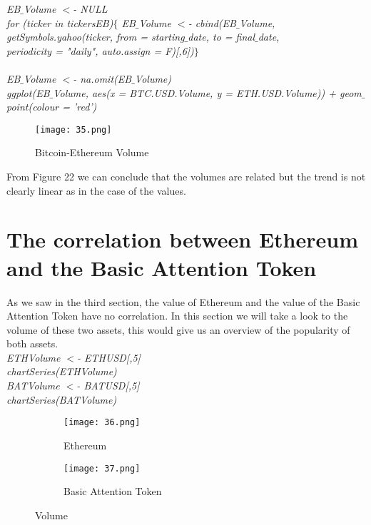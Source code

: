 \documentclass[14pt]{amsart}
\begin{document}
\noindent \textit{EB$\_$Volume $<$- NULL}\\
\noindent \textit{for (ticker in tickersEB)$\{$  EB$\_$Volume $<$- cbind(EB$\_$Volume, }\\
\indent\textit{getSymbols.yahoo(ticker, from = starting$\_$date, to = final$\_$date, }\\
\indent\textit{periodicity = "daily", auto.assign = F)[,6])$\}$}\\ \\

\noindent \textit{EB$\_$Volume $<$- na.omit(EB$\_$Volume)}\\
\noindent \textit{ggplot(EB$\_$Volume, aes(x = BTC.USD.Volume, y = ETH.USD.Volume)) + geom$\_$point(colour = 'red')}\\

\begin{figure}[h!]
  \texttt{[image: 35.png]}
  \caption{Bitcoin-Ethereum Volume}
  \label{fig:boat1}
\end{figure}

From Figure 22 we can conclude that the volumes are related but the trend is not clearly linear as in the case of the values.

\section{The correlation between Ethereum and the Basic Attention Token}
As we saw in the third section, the value of Ethereum and the value of the Basic Attention Token have no correlation. In this section we will take a look to the volume of these two assets, this would give us an overview of the popularity of both assets.\\

\noindent \textit{ETHVolume $<$- ETHUSD[,5]}\\
\noindent \textit{chartSeries(ETHVolume)}\\

\noindent \textit{BATVolume $<$- BATUSD[,5]}\\
\noindent \textit{chartSeries(BATVolume)}\\

\begin{figure}[h!]
  \centering
  \begin{subfigure}[b]{0.4\linewidth}
    \texttt{[image: 36.png]}
    \caption{Ethereum}
  \end{subfigure}
  \begin{subfigure}[b]{0.4\linewidth}
    \texttt{[image: 37.png]}
    \caption{Basic Attention Token}
  \end{subfigure}
  \caption{Volume}
\end{figure}
\end{document}
